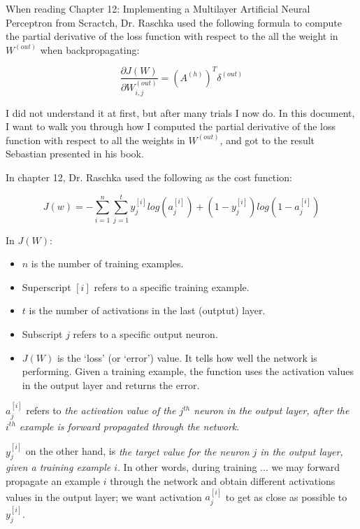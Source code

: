 \documentclass[../main.tex]{subfiles}
\begin{document}
When reading Chapter 12: Implementing a Multilayer Artificial Neural Perceptron
from Scractch, Dr. Raschka used the following formula to compute the partial 
derivative of the loss function with respect to the all the weight in $W^{(out)}$
when backpropagating:

\[\frac{\partial J(W)}{\partial W_{i,j}^{(out)}} = (A^{(h)})^{T} \delta^{(out)}\]

I did not understand it at first, but after many trials I now do. In this document,
I want to walk you through how I computed the partial derivative of the loss function
with respect to all the weights in $W^{(out)}$, and got to the result Sebastian presented in
his book.

\vspace{5mm} %

In chapter 12, Dr. Raschka used the following as the cost function:

\[J(w) = -\sum_{i = 1}^{n}\sum_{j=1}^{t} y_j^{[i]} log(a_j^{[i]}) + (1 - y_j^{[i]})log(1 - a_j^{[i]})\]

\pagebreak

In $J(W)$:
\vspace{5mm} %
\begin{itemize}
    \item $n$ is the number of training examples.
    \item Superscript $[i]$ refers to a specific training example.
    \item $t$ is the number of activations in the last (outptut) layer.
    \item Subscript $j$ refers to a specific output neuron.
    \item $J(W)$ is the `loss' (or `error') value. It tells how well the network is performing. Given
    a training example, the function uses the activation values in the output layer and returns
    the error.
\end{itemize}

$a_j^{[i]}$ refers to \emph{the activation value of the $j^{th}$ neuron in
the output layer, after the $i^{th}$ example is forward propagated through the 
network}. 

\vspace{5mm} %

$y_j^{[i]}$ on the other hand, is \emph{the target value for the
neuron $j$ in the output layer, given a training example $i$}. 
In other words, during training ... we may forward propagate an example $i$ through the network 
and obtain different activations values in the output layer; we want activation $a_j^{[i]}$ to get as 
close as possible to $y_j^{[i]}$. 

\vspace{5mm} %
\end{document}

